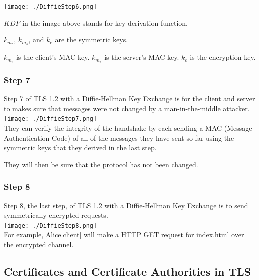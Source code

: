 \documentclass[11pt]{article} %
\begin{document}
\texttt{[image: ./DiffieStep6.png]}

$KDF$ in the image above stands for key derivation function.

$k_{m_c}$, $k_{m_s}$, and $k_{e}$ are the symmetric keys.

$k_{m_c}$ is the client's MAC key. $k_{m_s}$ is the server's MAC key. $k_{e}$ 
is the encryption key.

\newpage
\subsubsection{Step 7}
Step 7 of TLS 1.2 with a Diffie-Hellman Key Exchange is for the client and 
server to makes sure that messages were not changed by a man-in-the-middle 
attacker. \\

\texttt{[image: ./DiffieStep7.png]}
\\

They can verify the integrity of the handshake by each sending a MAC (Message 
Authentication Code) of all of the messages they have sent so far using the 
symmetric keys that they derived in the last step.

They will then be sure that the protocol has not been changed.

\newpage
\subsubsection{Step 8}
Step 8, the last step, of TLS 1.2 with a Diffie-Hellman Key Exchange is to 
send symmetrically encrypted requests. \\

\texttt{[image: ./DiffieStep8.png]}
\\

For example, Alice[client] will make a HTTP GET request for index.html over 
the encrypted channel.

\newpage
\subsection{Certificates and Certificate Authorities in TLS}
\end{document}
